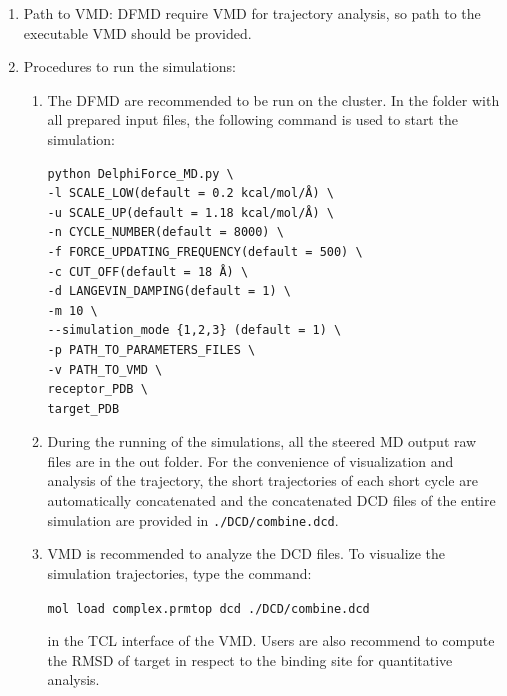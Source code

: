 \documentclass[9pt,tutorial]{livecoms}
\begin{document}
\begin{enumerate}
\item Path to VMD: DFMD require VMD for trajectory analysis, so path to the executable VMD should be provided.
\item 
Procedures to run the simulations:
\begin{enumerate}
\item The DFMD are recommended to be run on the cluster.  In the folder with all prepared input files, the following command is used to start the simulation:

\begin{verbatim}
python DelphiForce_MD.py \
-l SCALE_LOW(default = 0.2 kcal/mol/Å) \
-u SCALE_UP(default = 1.18 kcal/mol/Å) \
-n CYCLE_NUMBER(default = 8000) \
-f FORCE_UPDATING_FREQUENCY(default = 500) \
-c CUT_OFF(default = 18 Å) \
-d LANGEVIN_DAMPING(default = 1) \
-m 10 \
--simulation_mode {1,2,3} (default = 1) \
-p PATH_TO_PARAMETERS_FILES \
-v PATH_TO_VMD \
receptor_PDB \
target_PDB
\end{verbatim}

\item During the running of the simulations, all the steered MD output raw files are in the out folder. For the convenience of visualization and analysis of the trajectory, the short trajectories of each short cycle are automatically concatenated and the concatenated DCD files of the entire simulation are provided in \texttt{./DCD/combine.dcd}.
\item VMD is recommended to analyze the DCD files. To visualize the simulation trajectories, type the command:

\texttt{mol load complex.prmtop dcd ./DCD/combine.dcd}

in the TCL interface of the VMD. Users are also recommend to compute the RMSD of target in respect to the binding site for quantitative analysis.
\end{enumerate}
\end{enumerate}
\end{document}
